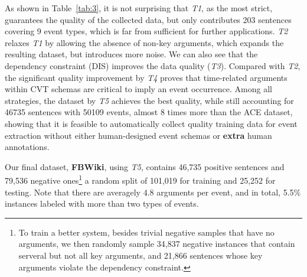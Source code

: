As shown in Table~\ref{tab:3}, it is not surprising that \emph{T1}, as the most strict, guarantees the quality of the collected data, but only contributes 203 sentences covering 9 event types, which is far from sufficient for further applications. \emph{T2} relaxes \emph{T1} by allowing the absence of non-key arguments, which expands the resulting dataset, but introduces more noise.
We can also see that the dependency constraint (DIS) improves the data quality (\emph{T3}).
Compared with \emph{T2}, the significant quality improvement by \emph{T4} proves that time-related arguments within CVT schemas are critical to imply an event occurrence. Among all strategies, the dataset by \emph{T5} achieves the best quality, while still accounting for 46735 sentences with 50109 events, almost 8 times more than the ACE dataset, showing that it is feasible to automatically collect quality training data for event extraction without either human-designed event schemas or \textbf{extra} human annotations.

Our final dataset, \textbf{FBWiki}, using \emph{T5}, contains 46,735 positive sentences and 79,536 negative ones\footnote{To train a better
system, besides trivial negative samples that have no arguments, we then randomly sample 34,837 negative instances that contain serveral
but not all key arguments, and 21,866 sentences whose key arguments violate the dependency constraint.}
 a random split of 101,019 for
training and 25,252 for testing. Note that there are averagely 4.8 arguments per event, and in total, 5.5\% instances labeled with more
than two types of events.


